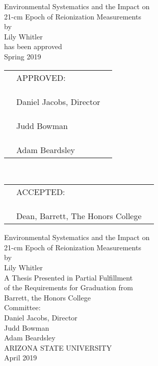 \documentclass[12pt]{article}
\begin{document}
\doublespacing
\begin{center}
Environmental Systematics and the Impact on \\ 21-cm Epoch of Reionization Measurements \\
by \\
Lily Whitler \\
has been approved \\
Spring 2019 \\[0.1\textheight]

\begingroup
\renewcommand{\arraystretch}{0.7}
\begin{tabular}{p{1cm}p{3.5in}p{1cm}}
	& \centering APPROVED: & \\
	& & \\ & & \\
	& \hrulefill & \\
	& \hfill Daniel Jacobs, Director & \\
	& & \\ & & \\
	& \hrulefill & \\
	& \hfill Judd Bowman & \\
	& & \\ & & \\
	& \hrulefill & \\
	& \hfill Adam Beardsley &
\end{tabular} \\[0.075\textheight]
\begin{tabular}{p{1cm}p{3.5in}p{1cm}}
	& \centering ACCEPTED: & \\
	& & \\ & & \\
	& \hrulefill & \\
	& \hfill Dean, Barrett, The Honors College &
\end{tabular}
\endgroup
\end{center}
\thispagestyle{empty}
\newpage
{}

\begin{center}
	Environmental Systematics and the Impact on \\ 21-cm Epoch of Reionization Measurements \\
	by \\
	Lily Whitler \\[0.15\textheight]
	
	A Thesis Presented in Partial Fulfillment \\
	of the Requirements for Graduation from \\
	Barrett, the Honors College \\[0.15\textheight]
	
	Committee: \\
	Daniel Jacobs, Director \\
	Judd Bowman \\
	Adam Beardsley \\[0.23\textheight]
	
	ARIZONA STATE UNIVERSITY \\
	April 2019
\end{center}
\thispagestyle{empty}
\end{document}
